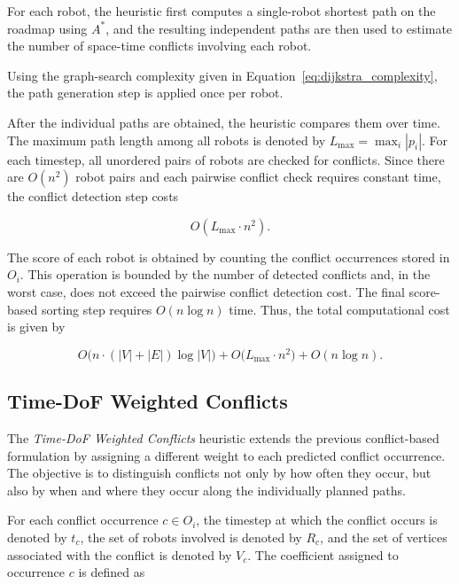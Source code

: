 For each robot, the heuristic first computes a single-robot shortest path on the roadmap using \(A^*\), and the resulting independent paths are then used to estimate the number of space-time conflicts involving each robot.

Using the graph-search complexity given in Equation~\ref{eq:dijkstra_complexity}, the path generation step is applied once per robot.

After the individual paths are obtained, the heuristic compares them over time. The maximum path length among all robots is denoted by \(L_{\max} = \max_i |p_i|\). For each timestep, all unordered pairs of robots are checked for conflicts. Since there are \(O(n^2)\) robot pairs and each pairwise conflict check requires constant time, the conflict detection step costs

\begin{equation}
    O(L_{\max} \cdot n^2).
\end{equation}

The score of each robot is obtained by counting the conflict occurrences stored in \(O_i\). This operation is bounded by the number of detected conflicts and, in the worst case, does not exceed the pairwise conflict detection cost. The final score-based sorting step requires \(O(n \log n)\) time. Thus, the total computational cost is given by

\begin{equation}
\label{eq:space_time_conflicts_heuristic}
    O\bigl(n \cdot (|V| + |E|)\log |V|\bigr)
    + O\bigl(L_{\max} \cdot n^2\bigr)
    + O(n \log n).
\end{equation}



\subsection{Time-DoF Weighted Conflicts}
\label{subsec:time_dof_weighted_conflicts}
\hspace{\parindent}
The \textit{Time-DoF Weighted Conflicts} heuristic extends the previous conflict-based formulation by assigning a different weight to each predicted conflict occurrence. The objective is to distinguish conflicts not only by how often they occur, but also by when and where they occur along the individually planned paths.

For each conflict occurrence \(c \in O_i\), the timestep at which the conflict occurs is denoted by \(t_c\), the set of robots involved is denoted by \(R_c\), and the set of vertices associated with the conflict is denoted by \(V_c\). The coefficient assigned to occurrence \(c\) is defined as

